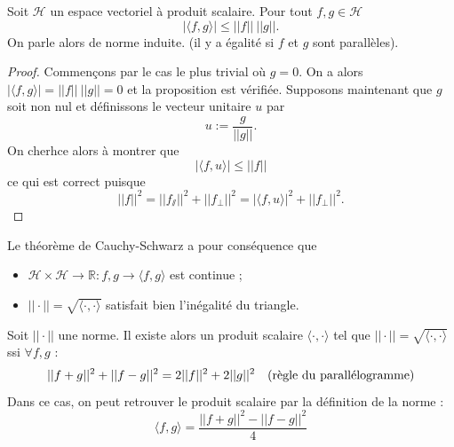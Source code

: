 \begin{theo}
    Soit $\mathcal{H}$ un espace vectoriel à produit scalaire. Pour tout $f,g\in\mathcal{H}$
    \begin{equation*}
        \left|\langle f,g \rangle\right| \leq ||f||\ ||g||.
    \end{equation*}
    On parle alors de norme induite. (il y a égalité si $f$ et $g$ sont parallèles).
    \label{theo:Cauchy-Schwarz}
\end{theo}

\begin{proof}
    Commençons par le cas le plus trivial où $g=0$. On a alors $\left|\langle f,g \rangle\right| = ||f||\ ||g|| = 0$ et la proposition est vérifiée. Supposons maintenant que $g$ soit non nul et définissons le vecteur unitaire $u$ par
    \begin{equation*}
        u := \frac{g}{||g||}.
    \end{equation*}
    On cherhce alors à montrer que
    \begin{equation*}
        \left|\langle f,u \rangle\right| \leq ||f||
    \end{equation*}
    ce qui est correct puisque
    \begin{equation*}
        ||f||^2 = ||f_\sslash||^2 + ||f_\bot||^2 = \left|\langle f,u \rangle\right|^2 + ||f_\bot||^2.
    \end{equation*}
\end{proof}

Le théorème de Cauchy-Schwarz a pour conséquence que
\begin{itemize}
    \item $\mathcal{H}\times\mathcal{H}\to\mathbb{R}:f,g\to\langle f,g \rangle$ est continue ;
    \item $||\cdot|| = \sqrt{\langle\cdot,\cdot\rangle}$ satisfait bien l'inégalité du triangle.
\end{itemize}

\begin{theo}
    Soit $||\cdot||$ une norme. Il existe alors un produit scalaire $\langle\cdot,\cdot\rangle$ tel que $||\cdot|| = \sqrt{\langle\cdot,\cdot\rangle}$ ssi $\forall f,g$ :
    \begin{equation*}
        ||f+g||^2 + ||f-g||^2 = 2||f||^2 + 2||g||^2 \quad\mathrm{(r\Grave{e}gle\ du\ parall\Acute{e}logramme)}
    \end{equation*}
    Dans ce cas, on peut retrouver le produit scalaire par la définition de la norme :
    \begin{equation*}
        \langle f,g \rangle = \frac{||f+g||^2 - ||f-g||^2}{4}
    \end{equation*}
\end{theo}

